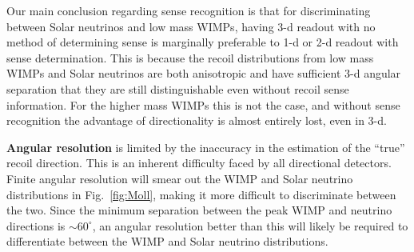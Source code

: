 Our main conclusion regarding sense recognition is that for discriminating between Solar neutrinos and low mass WIMPs, having 3-d readout with no method of determining sense is marginally preferable to 1-d or 2-d readout with sense determination. 
This is because the recoil distributions from low mass WIMPs and Solar neutrinos are both anisotropic and have sufficient 3-d angular separation that they are still distinguishable even without recoil sense information. For the higher mass WIMPs this is not the case, and 
without sense recognition the advantage of directionality is almost entirely lost, even in 3-d.


{\bf Angular resolution} is limited by the inaccuracy in the estimation of the ``true'' recoil direction. This is an inherent difficulty faced by all directional detectors. Finite angular resolution will smear out the WIMP and Solar neutrino distributions in Fig.~\ref{fig:Moll}, making it more difficult to discriminate between the two. Since the minimum separation between the peak WIMP and neutrino directions is $\sim60^\circ$, an angular resolution better than this will likely be required to differentiate between the WIMP and Solar neutrino distributions.

